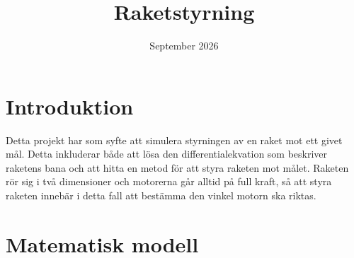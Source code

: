 \documentclass{article}
\title{Raketstyrning}
\author{}
\date{September 2026}
\begin{document}
\maketitle
\tableofcontents


\newpage
\section{Introduktion}
Detta projekt har som syfte att simulera styrningen av en raket mot ett givet mål. Detta inkluderar både att lösa den differentialekvation som beskriver raketens bana och att hitta en metod för att styra raketen mot målet. Raketen rör sig i två dimensioner och motorerna går alltid på full kraft, så att styra raketen innebär i detta fall att bestämma den vinkel motorn ska riktas.

\section{Matematisk modell}
\end{document}
